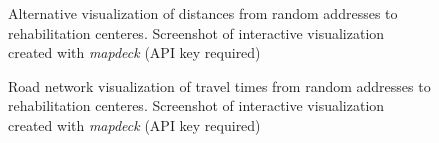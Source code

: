\documentclass[utf8]{frontiersHLTH}
\begin{document}
\begin{figure}[h!]
\begin{center}
\end{center}
\caption{Alternative visualization of distances from random addresses to rehabilitation centeres. Screenshot of interactive visualization created with {\em mapdeck} (API key required)}\label{fig:RehabCenterAddressDistanceHex}
\end{figure}

\begin{figure}[h!]
\begin{center}
\end{center}
\caption{Road network visualization of travel times from random addresses to rehabilitation centeres. Screenshot of interactive visualization created with {\em mapdeck} (API key required)}\label{fig:RehabCenterAddressDistance}
\end{figure}




\end{document}
